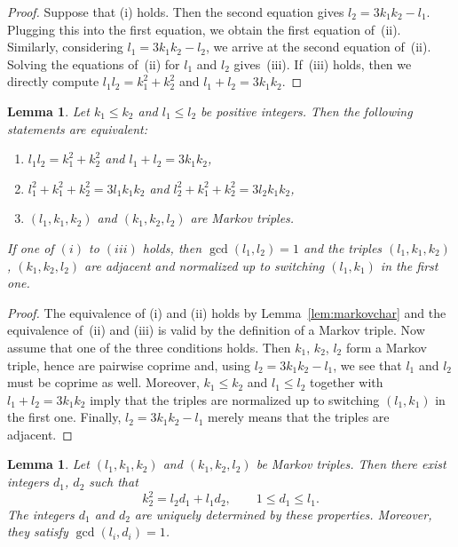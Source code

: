 \documentclass[pdftex]{sigma}
\newtheorem{lem}[thm]{Lemma}
\theoremstyle{definition}
\begin{document}
\begin{proof}
Suppose that (i) holds. Then the second equation gives
$l_2 = 3k_1k_2 - l_1$. Plugging this into the first
equation, we obtain the first equation of~(ii).
Similarly, considering $l_1 = 3k_1k_2 - l_2$, we arrive
at the second equation of~(ii).
Solving the equations of~(ii) for $l_1$ and $l_2$
gives~(iii).
If~(iii) holds, then we directly compute
$l_1l_2 = k_1^2 + k_2^2$ and $l_1+l_2 = 3k_1k_2$.
\end{proof}


\begin{lem}
\label{prop:markovchar}
Let $k_1 \le k_2$ and $l_1 \le l_2$ be positive integers.
Then the following statements are equivalent:
\begin{enumerate}\itemsep=0pt
\item[$(i)$]
$l_1l_2 = k_1^2 + k_2^2$ and $l_1+l_2 = 3k_1k_2$,
\item[$(ii)$]
$l_1^2 + k_1^2 + k_2^2 = 3l_1k_1k_2$ and $l_2^2 + k_1^2 + k_2^2 = 3l_2k_1k_2$,
\item[$(iii)$]
$(l_1,k_1,k_2)$ and $(k_1,k_2,l_2)$ are Markov triples.
\end{enumerate}
If one of $(i)$ to $(iii)$ holds, then $\gcd(l_1,l_2)=1$
and the triples $(l_1,k_1,k_2)$, $(k_1,k_2,l_2)$
are adjacent and normalized up to switching $(l_1,k_1)$
in the first one.
\end{lem}


\begin{proof}
The equivalence of (i) and (ii) holds by Lemma~\ref{lem:markovchar}
and the equivalence of~(ii) and (iii) is valid by the definition of
a Markov triple.
Now assume that one of the three conditions holds.
Then $k_1$, $k_2$, $l_2$ form a Markov triple, hence are pairwise
coprime and, using $l_2 = 3k_1k_2 - l_1$, we see that
$l_1$ and $l_2$ must be coprime as well.
Moreover, $k_1 \le k_2$ and $l_1 \le l_2$ together with
$l_1+l_2=3k_1k_2$ imply that the triples are normalized
up to switching $(l_1,k_1)$ in the first one.
Finally, $l_2= 3k_1k_2 - l_1$ merely means that the
triples are adjacent.
\end{proof}


\begin{lem}
\label{prop:markovd1d2}
Let $(l_1,k_1,k_2)$ and $(k_1,k_2,l_2)$ be
Markov triples.
Then there exist integers $d_1$, $d_2$ such that
\[
k_2^2 = l_2d_1 + l_1d_2,
\qquad
1 \le d_1 \le l_1.
\]
The integers $d_1$ and $d_2$ are uniquely determined by these
properties. Moreover, they satisfy $\gcd(l_i,d_i)=1$.
\end{lem}
\end{document}
